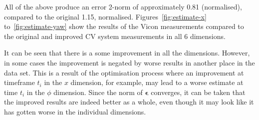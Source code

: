 All of the above produce an error 2-norm of approximately 0.81 (normalised), compared to the original 1.15, normalised. Figures~\ref{fig:estimate-x} to~\ref{fig:estimate-yaw} show the results of the Vicon measurements compared to the original and improved CV system measurements in all 6 dimensions.







It can be seen that there is a some improvement in all the dimensions. However, in some cases the improvement is negated by worse results in another place in the data set. This is a result of the optimisation process where an improvement at timeframe $t_i$ in the $x$ dimension, for example, may lead to a worse estimate at time $t_i$ in the $\phi$ dimension. Since the norm of $\bm{\epsilon}$ converges, it can be taken that the improved results are indeed better as a whole, even though it may look like it has gotten worse in the individual dimensions.

